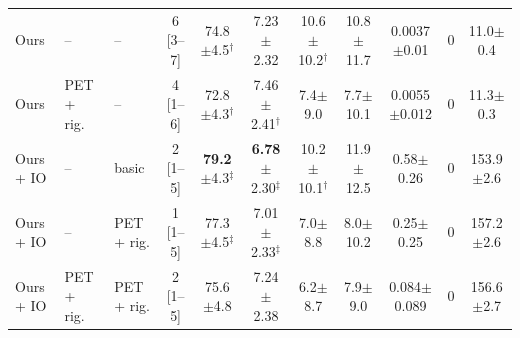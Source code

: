 \begin{table}[t]
{\begin{tabular}{lllcccccccc}
\midrule
Ours & -- & -- & 6 [3--7] & 74.8$\pm$4.5$^{\dagger}$ & 7.23$\pm$2.32 & 10.6$\pm$10.2$^{\dagger}$ & 10.8$\pm$11.7 & 0.0037$\pm$0.01 & 0 & 11.0$\pm$0.4 \\
Ours & PET + rig. & -- & 4 [1--6] & 72.8$\pm$4.3$^{\dagger}$ & 7.46$\pm$2.41$^{\dagger}$ & 7.4$\pm$9.0 & 7.7$\pm$10.1 & 0.0055$\pm$0.012 & 0 & 11.3$\pm$0.3 \\
Ours + IO & -- & basic & 2 [1--5] & \textbf{79.2}$\pm$4.3$^{\ddagger}$ & \textbf{6.78}$\pm$2.30$^{\ddagger}$ & 10.2$\pm$10.1$^{\dagger}$ & 11.9$\pm$12.5 & 0.58$\pm$0.26 & 0 & 153.9$\pm$2.6 \\
Ours + IO & -- & PET + rig. & 1 [1--5] & 77.3$\pm$4.5$^{\ddagger}$ & 7.01$\pm$2.33$^{\ddagger}$ & 7.0$\pm$8.8 & 8.0$\pm$10.2 & 0.25$\pm$0.25 & 0 & 157.2$\pm$2.6 \\
Ours + IO & PET + rig. & PET + rig. & 2 [1--5] & 75.6$\pm$4.8 & 7.24$\pm$2.38 & 6.2$\pm$8.7 & 7.9$\pm$9.0 & 0.084$\pm$0.089 & 0 & 156.6$\pm$2.7 \\
\bottomrule
\end{tabular}}
\end{table}
